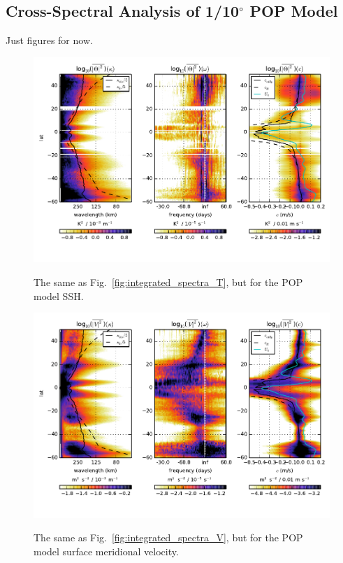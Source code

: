 \documentclass[10pt]{article}
\begin{document}
\subsection{Cross-Spectral Analysis of 1/10$^\circ$ POP Model}

Just figures for now.

\begin{figure}[t]
  \noindent\includegraphics{../figures/POP_50degwide/integrated_spectra_T.pdf}\\
  \caption{The same as Fig.~\ref{fig:integrated_spectra_T}, but for the POP model SSH.}
  \label{fig:integrated_spectra_T_POP}
\end{figure}

\begin{figure}[t]
  \noindent\includegraphics{../figures/POP_50degwide/integrated_spectra_V.pdf}\\
  \caption{The same as Fig.~\ref{fig:integrated_spectra_V}, but for the POP model surface meridional velocity.}
  \label{fig:integrated_spectra_V_POP}
\end{figure}
\end{document}
